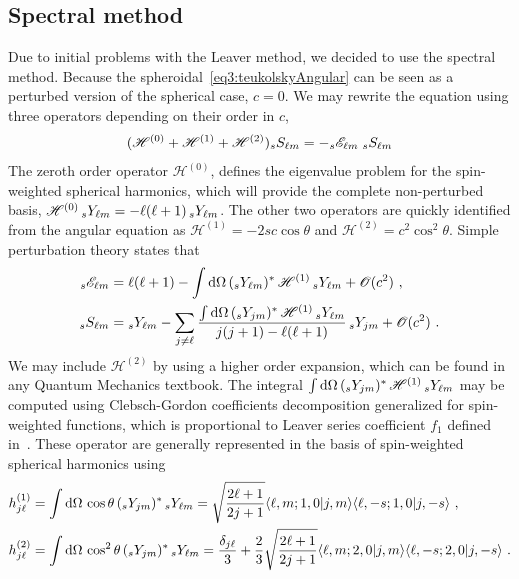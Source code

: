 \subsection{Spectral method}

Due to initial problems with the Leaver method, we decided to use the spectral method.
Because the spheroidal~\eqref{eq3:teukolskyAngular} can be seen as a perturbed version of the spherical case, $c=0$.
We may rewrite the equation using three operators depending on their order in $c$, 
\begin{align}
	\label{eq4:angularEqH012}
	( \mathscr{H}^{(0)} +  \mathscr{H}^{(1)} + \mathscr{H}^{(2)} ) \uu[s]{S}{\ell m} = - \uu[s]{\mathscr{E}}{\ell m}  \;\uu[s]{S}{\ell m} 
\end{align}
The zeroth order operator $\mathscr{H}^{(0)}$, defines the eigenvalue problem for the spin-weighted spherical harmonics, which will provide the complete non-perturbed basis, $\mathscr{H}^{(0)} \,\uu[s]{Y}{\ell m} = -\ell(\ell+1) \,\uu[s]{Y}{\ell m}$.
The other two operators are quickly identified from the angular equation as $\mathscr{H}^{(1)} = - 2 s c \cos\theta$ and $\mathscr{H}^{(2)} = c^2 \cos^2\theta$.
Simple perturbation theory states that
\begin{align}
	\uu[s]{\mathscr{E}}{\ell m} &= \ell(\ell+1) - \int \dd\Omega \,(\uu[s]{Y}{\ell m})^* \,\mathscr{H}^{(1)} \,\uu[s]{Y}{\ell m} + \mathscr{O}(c^2) ~, \\
	\uu[s]{S}{\ell m} &= \uu[s]{Y}{\ell m} - \sum_{j\ne\ell} \frac{\int \dd\Omega \,(\uu[s]{Y}{j m})^* \,\mathscr{H}^{(1)} \,\uu[s]{Y}{\ell m}}{j(j+1)-\ell(\ell+1)} \, \uu[s]{Y}{j m} +\mathscr{O}(c^2) ~.
\end{align}
We may include $\mathscr{H}^{(2)}$ by using a higher order expansion, which can be found in any Quantum Mechanics textbook.
The integral $\int \dd\Omega \,(\uu[s]{Y}{j m})^* \,\mathscr{H}^{(1)} \,\uu[s]{Y}{\ell m}$ may be computed using Clebsch-Gordon coefficients decomposition generalized for spin-weighted functions, which is proportional to Leaver series coefficient $f_1$ defined in~.
These operator are generally represented in the basis of spin-weighted spherical harmonics using
\begin{align}
	\begin{split}
	h^{(1)}_{j\ell} &= \int \dd\Omega \,\cos\theta \,(\uu[s]{Y}{j m})^* \,\uu[s]{Y}{\ell m} = \sqrt{\frac{2 \ell+1}{2 j+1}} \langle \ell,m; 1,0 | j,m \rangle \langle \ell, -s; 1,0 | j, -s \rangle ~, \\
	h^{(2)}_{j\ell} &= \int \dd\Omega \,\cos^2\theta \,(\uu[s]{Y}{j m})^* \,\uu[s]{Y}{\ell m} = \frac{\delta_{j\ell}}{3} + \frac{2}{3}\sqrt{\frac{2 \ell+1}{2 j+1}} \langle \ell,m; 2,0 | j,m \rangle \langle \ell, -s; 2,0 | j, -s \rangle ~.
	\end{split}
\end{align}

